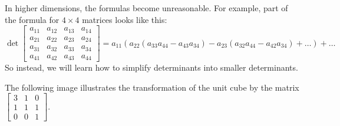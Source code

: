 \begin{applicationActivities}
\begin{remark}
In higher dimensions, the formulas become unreasonable.  
For example, part of the formula for \(4\times4\) matrices looks like this:
\[
  \det\begin{bmatrix}
    a_{11} & a_{12} & a_{13} & a_{14} \\
    a_{21} & a_{22} & a_{23} & a_{24} \\
    a_{31} & a_{32} & a_{33} & a_{34} \\
    a_{41} & a_{42} & a_{43} & a_{44}
  \end{bmatrix}
    =
  a_{11}(a_{22}(a_{33}a_{44}-a_{43}a_{34})-a_{23}(a_{32}a_{44}-a_{42}a_{34})+\dots)+\dots
\]
So instead, we will learn how to simplify determinants into
smaller determinants.
\end{remark}


\begin{activity}{5}
  The following image illustrates the transformation of the unit cube
  by the matrix
  $\begin{bmatrix} 3 & 1 & 0 \\  1 & 1 & 1 \\  0 & 0 & 1\end{bmatrix}$.

  \begin{center}
\end{center}
\end{activity}
\end{applicationActivities}
